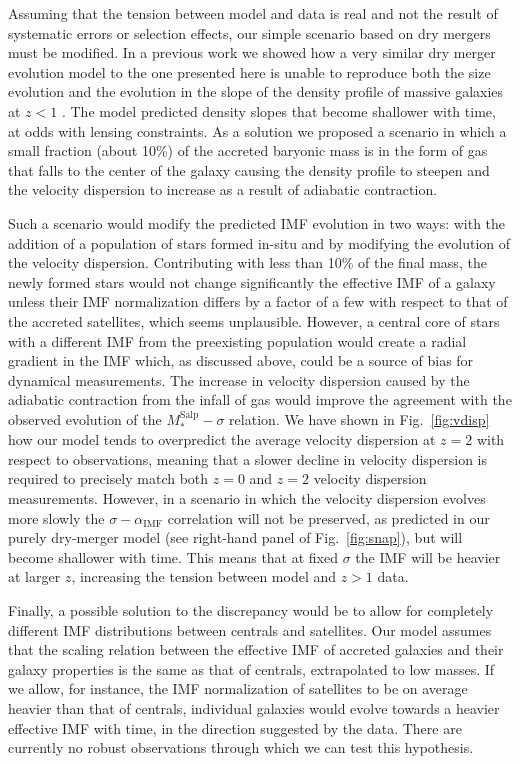 \documentclass[usenatbib]{mnras}
\def\msalp{M_*^{\mathrm{Salp}}}
\def\aimf{\alpha_{\mathrm{IMF}}}
\def\Fref#1{Fig.~\ref{#1}\xspace}
\begin{document}
Assuming that the tension between model and data is real and not the result of systematic errors or selection effects,
 our simple scenario based on dry mergers must be modified.  In
a previous work we showed how a very similar dry merger evolution
model to the one presented here is unable to reproduce both the size
evolution and the evolution in the slope of the density profile of
massive galaxies at $z<1$ \citep{SNT14}.  The model predicted density
slopes that become shallower with time, at odds with lensing
constraints. As a solution we proposed a scenario in which a small
fraction (about 10\%) of the accreted baryonic mass is in the form of
gas that falls to the center of the galaxy causing the density profile
to steepen and the velocity dispersion to increase as a result of
adiabatic contraction.  

Such a scenario would modify the predicted IMF
evolution in two ways: with the addition of a population of stars
formed in-situ and by modifying the evolution of the velocity
dispersion.  Contributing with less than 10\% of the final mass, the
newly formed stars would not change significantly the effective IMF of
a galaxy unless their IMF normalization differs by a factor of a few
with respect to that of the accreted satellites, which seems
unplausible. However, a central core of stars with a different IMF
from the preexisting population would create a radial gradient in the
IMF which, as discussed above, could be a source of bias for dynamical
measurements.  The increase in velocity dispersion caused by the
adiabatic contraction from the infall of gas would improve the
agreement with the observed evolution of the $\msalp-\sigma$ relation.
We have shown in \Fref{fig:vdisp} how our model tends to overpredict
the average velocity dispersion at $z=2$ with respect to observations,
meaning that a slower decline in velocity dispersion is required to
precisely match both $z=0$ and $z=2$ velocity dispersion measurements.
However, in a scenario in which the velocity dispersion evolves more
slowly the $\sigma-\aimf$ correlation will not be preserved, as
predicted in our purely dry-merger model (see right-hand panel of
\Fref{fig:snap}), but will become shallower with time. This means that
at fixed $\sigma$ the IMF will be heavier at larger $z$, increasing
the tension between model and $z>1$ data.

Finally, a possible solution to the discrepancy would be to allow for completely different IMF distributions between centrals and satellites. Our model assumes that the scaling relation between the effective IMF of accreted galaxies and their galaxy properties is the same as that of centrals, extrapolated to low masses.
If we allow, for instance, the IMF normalization of satellites to be on average heavier than that of centrals, individual galaxies would evolve towards a heavier effective IMF with time, in the direction suggested by the data. There are currently no robust observations through which we can test this hypothesis.
\end{document}
